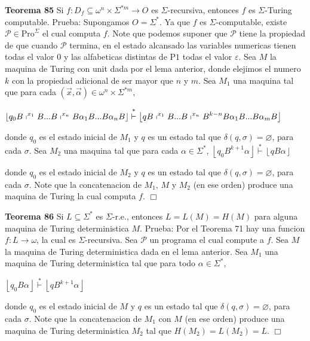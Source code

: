 \par \textbf{Teorema 85} Si \(f:D_{f}\subseteq \omega ^{n}\times \Sigma ^{\ast m}\rightarrow O\) es \( \Sigma \)-recursiva, entonces \(f\) es \(\Sigma \)-Turing computable.
Prueba: Supongamos \(O=\Sigma ^{\ast }.\) Ya que \(f\) es \(\Sigma \)-computable, existe \( \mathcal{P}\in \mathrm{Pro}^{\Sigma }\) el cual computa \(f\). Note que podemos suponer que \(\mathcal{P}\) tiene la propiedad de que cuando \(\mathcal{P}\) termina, en el estado alcansado las variables numericas tienen todas el valor \(0\) y las alfabeticas distintas de \(\mathrm{P}1\) todas el valor \( \varepsilon \). Sea \(M\) la maquina de Turing con unit dada por el lema anterior, donde elejimos el numero \(k\) con la propiedad adicional de ser mayor que \(n\) y \(m\). Sea \(M_{1}\) una maquina tal que para cada \((\vec{x}, \vec{\alpha})\in \omega ^{n}\times \Sigma ^{\ast m}\),

\(\displaystyle \left\lfloor q_{0}B\shortmid ^{x_{1}}B...B\shortmid ^{x_{n}}B\alpha _{1}B...B\alpha _{n}B\right\rfloor \overset{\ast }{\vdash }\left\lfloor qB\shortmid ^{x_{1}}B...B\shortmid ^{x_{n}}B^{k-n}B\alpha _{1}B...B\alpha _{m}B\right\rfloor \)

donde \(q_{0}\) es el estado inicial de \(M_{1}\) y \(q\) es un estado tal que \( \delta (q,\sigma )=\varnothing \), para cada \(\sigma .\) Sea \(M_{2}\) una maquina tal que para cada \(\alpha \in \Sigma ^{\ast }\),
\(\displaystyle \left\lfloor q_{0}B^{k+1}\alpha \right\rfloor \overset{\ast }{\vdash } \left\lfloor qB\alpha \right\rfloor \)

donde \(q_{0}\) es el estado inicial de \(M_{2}\) y \(q\) es un estado tal que \( \delta (q,\sigma )=\varnothing \), para cada \(\sigma \). Note que la concatenacion de \(M_{1}\), \(M\) y \(M_{2}\) (en ese orden) produce una maquina de Turing la cual computa \(f\). \(\Box\)





\textbf{Teorema 86} Si \(L\subseteq \Sigma ^{\ast }\) es \(\Sigma \)-r.e., entonces \(L=L(M)=H(M)\) para alguna maquina de Turing deterministica \(M.\)
Prueba: Por el Teorema 71 hay una funcion \(f:L\rightarrow \omega \), la cual es \(\Sigma \)-recursiva\(.\) Sea \(\mathcal{P}\) un programa el cual compute a \(f\). Sea \(M\) la maquina de Turing deterministica dada en el lema anterior. Sea \(M_{1}\) una maquina de Turing deterministica tal que para todo \(\alpha \in \Sigma ^{\ast }\),

\(\displaystyle \left\lfloor q_{0}B\alpha \right\rfloor \overset{\ast }{\vdash }\left\lfloor qB^{k+1}\alpha \right\rfloor \)

donde \(q_{0}\) es el estado inicial de \(M\) y \(q\) es un estado tal que \(\delta (q,\sigma )=\varnothing \), para cada \(\sigma \). Note que la concatenacion de \( M_{1}\) con \(M\) (en ese orden) produce una maquina de Turing deterministica \( M_{2}\) tal que \(H(M_{2})=L(M_{2})=L\). \(\Box\)

